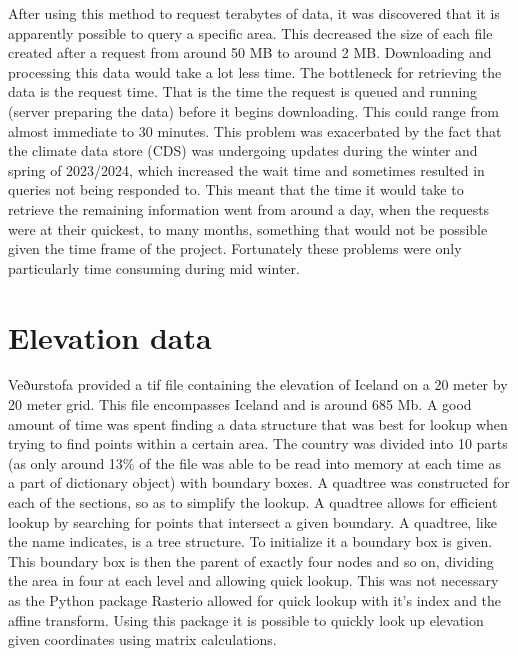 After using this method to request terabytes of data, it was discovered that it is apparently possible to query a specific area. This decreased the size of each file created after a request from around 50 MB to around 2 MB. Downloading and processing this data would take a lot less time. The bottleneck for retrieving the data is the request time. That is the time the request is queued and running (server preparing the data) before it begins downloading. This could range from almost immediate to 30 minutes. This problem was exacerbated by the fact that the climate data store (CDS) was undergoing updates during the winter and spring of 2023/2024, which increased the wait time and sometimes resulted in queries not being responded to. This meant that the time it would take to retrieve the remaining information went from around a day, when the requests were at their quickest, to many months, something that would not be possible given the time frame of the project. Fortunately these problems were only particularly time consuming during mid winter.

\section{Elevation data}
Veðurstofa provided a tif file containing the elevation of Iceland on a 20 meter by 20 meter grid. This file encompasses Iceland and is around 685 Mb. A good amount of time was spent finding a data structure that was best for lookup when trying to find points within a certain area. The country was divided into 10 parts (as only around 13\% of the file was able to be read into memory at each time as a part of dictionary object) with boundary boxes. A quadtree was constructed for each of the sections, so as to simplify the lookup. A quadtree allows for efficient lookup by searching for points that intersect a given boundary. A quadtree, like the name indicates, is a tree structure. To initialize it a boundary box is given. This boundary box is then the parent of exactly four nodes and so on, dividing the area in four at each level and allowing quick lookup. This was not necessary as the Python package Rasterio allowed for quick lookup with it's index and the affine transform. Using this package it is possible to quickly look up elevation given coordinates using matrix calculations.